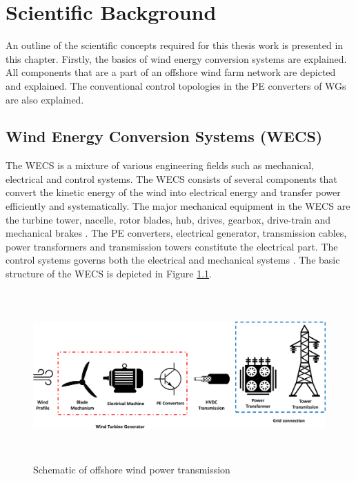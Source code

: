 \chapter{Scientific Background}\label{2}
An outline of the scientific concepts required for this thesis work is presented in this chapter. Firstly, the basics of wind energy conversion systems are explained. All components that are a part of an offshore wind farm network are depicted and explained. The conventional control topologies in the \gls{PE} converters of \gls{WG}s are also explained.

\section{Wind Energy Conversion Systems (WECS)}\label{WECS_theory}
The \gls{WECS} is a mixture of various engineering fields such as mechanical, electrical and control systems. The \gls{WECS} consists of several components that convert the kinetic energy of the wind into electrical energy and transfer power efficiently and systematically. The major mechanical equipment in the \gls{WECS} are the turbine tower, nacelle, rotor blades, hub, drives, gearbox, drive-train and mechanical brakes \cite{manwell2010wind}. The \gls{PE} converters, electrical generator, transmission cables, power transformers and transmission towers constitute the electrical part. The control systems governs both the electrical and mechanical systems \cite{yaramasu_high-power_2015}.
The basic structure of the \gls{WECS} is depicted in Figure \ref{fig:WECS}.   

\begin{figure}[H]
\centering
    \includegraphics[height = 6.5cm,width = \textwidth]{Diagrams/Chapter_2/WECS.pdf}
    \caption{Schematic of offshore wind power transmission}
    \label{fig:WECS}
\end{figure}

